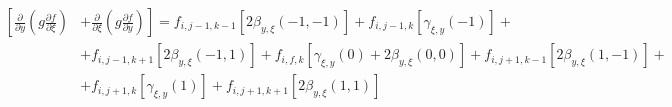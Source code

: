 \begin{equation*}
    \begin{split}
        \left[
            \frac
                {\partial}
                {\partial y}
            \left(
                g
                \frac
                    {\partial f}
                    {\partial \xi}
            \right)
        \right.&
        \left.
            +
            \frac
                {\partial}
                {\partial \xi}
            \left(
                g
                \frac
                    {\partial f}
                    {\partial y}
            \right)
        \right]
        =
        f_{i, j-1, k-1}
        \left[
            2
            \beta_{y, \xi} \left(-1, -1\right)
        \right]
        +
        f_{i, j-1, k}
        \left[
            \gamma_{\xi, y} \left(-1\right)
        \right]
        +
        \\
        &
        +
        f_{i, j-1, k+1}
        \left[
            2
            \beta_{y, \xi} \left(-1, 1\right)
        \right]
        +
        f_{i, f, k}
        \left[
            \gamma_{\xi, y} \left(0\right)
            +
            2
            \beta_{y, \xi} \left(0, 0\right)
        \right]
        +
        f_{i, j+1, k-1}
        \left[
            2
            \beta_{y, \xi} \left(1, -1\right)
        \right]
        +
        \\
        &
        +
        f_{i, j+1, k}
        \left[
            \gamma_{\xi, y} \left(1\right)
        \right]
        +
        f_{i, j+1, k+1}
        \left[
            2
            \beta_{y, \xi} \left(1, 1\right)
        \right]
    \end{split}
\end{equation*}